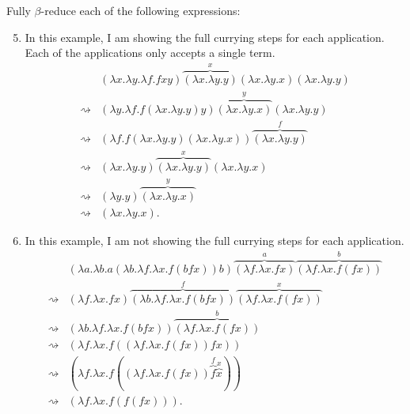 \documentclass{hw}
\begin{document}
Fully $\beta$-reduce each of the following expressions:

\begin{enumerate}
    \setcounter{enumi}{4}
    \item In this example, I am showing the full currying steps for each
        application. Each of the applications only accepts a single term.
        \begin{align*}
            &({\lambda}x.{\lambda}y.{\lambda}f.fxy)\overbrace{({\lambda}x.{\lambda}y.y)}^{x}({\lambda}x.{\lambda}y.x)({\lambda}x.{\lambda}y.y)\\
            \rightsquigarrow&({\lambda}y.{\lambda}f.f({\lambda}x.{\lambda}y.y)y)\overbrace{({\lambda}x.{\lambda}y.x)}^{y}({\lambda}x.{\lambda}y.y)\\
            \rightsquigarrow&({\lambda}f.f({\lambda}x.{\lambda}y.y)({\lambda}x.{\lambda}y.x))\overbrace{({\lambda}x.{\lambda}y.y)}^{f}\\
            \rightsquigarrow&({\lambda}x.{\lambda}y.y)\overbrace{({\lambda}x.{\lambda}y.y)}^x({\lambda}x.{\lambda}y.x)\\
            \rightsquigarrow&({\lambda}y.y)\overbrace{({\lambda}x.{\lambda}y.x)}^y\\
            \rightsquigarrow&({\lambda}x.{\lambda}y.x).
        \end{align*}

    \item In this example, I am not showing the full currying steps for each
        application.
        \begin{align*}
            &({\lambda}a.{\lambda}b.a({\lambda}b.{\lambda}f.{\lambda}x.f(bfx))b)\overbrace{({\lambda}f.{\lambda}x.fx)}^a\overbrace{({\lambda}f.{\lambda}x.f(fx))}^b\\
            \rightsquigarrow&({\lambda}f.{\lambda}x.fx)\overbrace{({\lambda}b.{\lambda}f.{\lambda}x.f(bfx))}^f\overbrace{({\lambda}f.{\lambda}x.f(fx))}^x\\
            \rightsquigarrow&({\lambda}b.{\lambda}f.{\lambda}x.f(bfx))\overbrace{({\lambda}f.{\lambda}x.f(fx))}^b\\
            \rightsquigarrow&({\lambda}f.{\lambda}x.f(({\lambda}f.{\lambda}x.f(fx))fx))\\
            \rightsquigarrow&({\lambda}f.{\lambda}x.f(({\lambda}f.{\lambda}x.f(fx))\overbrace{f}^f\overbrace{x}^x))\\
            \rightsquigarrow&({\lambda}f.{\lambda}x.f(f(fx))).
        \end{align*}
\end{enumerate}
\end{document}
